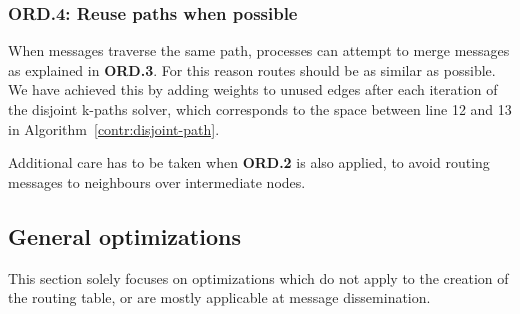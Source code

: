 
\subsubsection{ORD.4: Reuse paths when possible}
When messages traverse the same path, processes can attempt to merge messages as explained in \textbf{ORD.3}. For this reason routes should be as similar as possible. We have achieved this  by adding weights to unused edges after each iteration of the disjoint k-paths solver, which corresponds to the space between line 12 and 13 in Algorithm~\ref{contr:disjoint-path}. 

Additional care has to be taken when \textbf{ORD.2} is also applied, to avoid routing messages to neighbours over intermediate nodes.

\subsection{General optimizations}
This section solely focuses on optimizations which do not apply to the creation of the routing table, or are mostly applicable at message dissemination.

